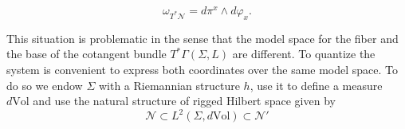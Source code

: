\documentclass{elsarticle}%
\begin{document}
\begin{equation}
\label{eq:symplecticForm}
\omega_{T^*\mathcal{N}}=  d\pi^x \wedge d\varphi_x.
\end{equation}

This situation is problematic in the sense that the model space for the fiber and the base of the cotangent bundle $T^*\Gamma(\Sigma,L)$ are different. To quantize the system is convenient to express both coordinates over the same model space. To do so we endow $\Sigma$ with a Riemannian structure $h$, use it to define a measure $d\mathrm{Vol}$ and use the natural structure of rigged Hilbert space given by 
\begin{equation}
\label{eq:rhsOnSigma}
\mathcal{N}\subset L^2(\Sigma,d\textrm{Vol})\subset \mathcal{N}'
\end{equation} 
\end{document}
